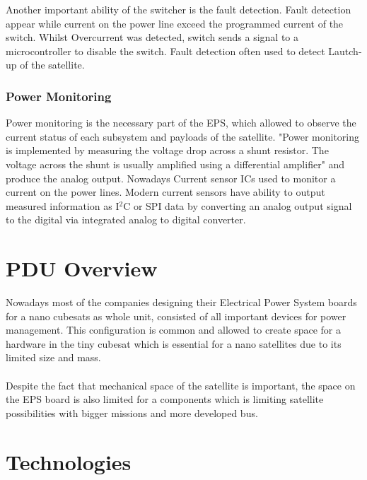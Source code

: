 Another important ability of the switcher is the fault detection. Fault detection appear while current on the power line exceed the programmed current of the switch. Whilst Overcurrent was detected, switch sends a signal to a microcontroller to disable the switch. Fault detection often used to detect Lautch-up of the satellite.\\

\subsubsection{Power Monitoring}

Power monitoring is the necessary part of the EPS, which allowed to observe the current status of each subsystem and payloads of the satellite. \cite{22} "Power monitoring is implemented by measuring the 
voltage drop across a shunt resistor.  The voltage across the shunt  is  usually  amplified  using  a  differential amplifier" and produce the analog output. Nowadays Current sensor ICs used to monitor a current on the power lines. Modern current sensors have ability to output measured information as I$^{2}$C or SPI data by converting an analog output signal to the digital via integrated analog to digital converter. 

\newpage   

\section{PDU Overview \label{sec:tech}}
Nowadays most of the companies designing their Electrical Power System boards for a nano cubesats as whole unit, consisted of all important devices for power management. This configuration is common and allowed to create space for a hardware in the tiny cubesat which is essential for a nano satellites due to its limited size and mass. 
\\ \\ Despite the fact that mechanical space of the satellite is important, the space on the EPS board is also limited for a components which is limiting satellite possibilities with bigger missions and more developed bus.  

\section{Technologies \label{sec:tech}}

